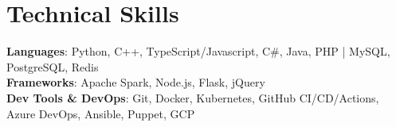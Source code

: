 \section{Technical Skills}
\begin{itemize}[leftmargin=0.15in, label={}]
    \small{\item{
        \textbf{Languages}{: Python, C++, TypeScript/Javascript, C\#, Java, PHP | MySQL, PostgreSQL, Redis} \\
        \textbf{Frameworks}{: Apache Spark, Node.js, Flask, jQuery} \\ %
        \textbf{Dev Tools \& DevOps}{: Git, Docker, Kubernetes, GitHub CI/CD/Actions, Azure DevOps, Ansible, Puppet, GCP} \\
    }}
\end{itemize}
